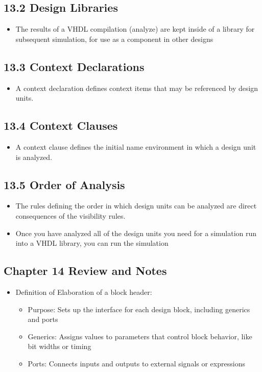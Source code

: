 \documentclass[a4paper,12pt]{article}
\begin{document}
	\subsection*{13.2 Design Libraries}
	\begin{itemize}
		\item The results of a VHDL compilation (analyze) are kept inside of a library for subsequent simulation, for use as a component in other designs
	\end{itemize}
	
	\subsection*{13.3 Context Declarations}
	\begin{itemize}
		\item A context declaration defines context items that may be referenced by design units.
	\end{itemize}
	
	\subsection*{13.4 Context Clauses}
	\begin{itemize}
		\item A context clause defines the initial name environment in which a design unit is analyzed.
	\end{itemize}
	
	\subsection*{13.5 Order of Analysis}
	\begin{itemize}
		\item The rules defining the order in which design units can be analyzed are direct consequences of the visibility
		rules. 
		\item Once you have analyzed all of the design units you need for a simulation run into a VHDL library, you can run the simulation
	\end{itemize}
	
	
	\subsection*{Chapter 14 Review and Notes}
	\begin{itemize}
		\item Definition of Elaboration of a block header:
		\begin{itemize}
			\item Purpose: Sets up the interface for each design block, including generics and ports
			\item Generics: Assigns values to parameters that control block behavior, like bit widths or timing
			\item Ports: Connects inputs and outputs to external signals or expressions
		\end{itemize}	
	\end{itemize}
	
\end{document}
